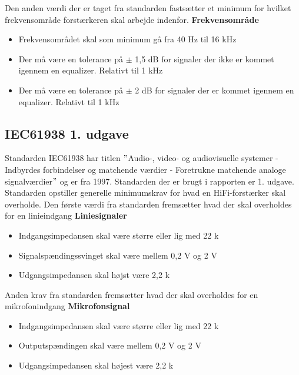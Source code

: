 Den anden værdi der er taget fra standarden fastsætter et minimum for hvilket frekvensområde forstærkeren skal arbejde indenfor.
\newline 
\newline
\textbf{Frekvensområde}
\begin{itemize}
\item Frekvensområdet skal som minimum gå fra 40 Hz til 16 kHz
\item Der må være en tolerance på $\pm$ 1,5 dB for signaler der ikke er kommet igennem en equalizer. Relativt til 1 kHz
\item Der må være en tolerance på $\pm$ 2 dB for signaler der er kommet igennem en equalizer. Relativt til 1 kHz
\end{itemize}


\subsection*{IEC61938 1. udgave}
\label{IEC61938}
Standarden IEC61938 har titlen $"$Audio-, video- og audiovisuelle systemer - Indbyrdes forbindelser og matchende værdier - Foretrukne matchende analoge signalværdier$"$ og er fra 1997. Standarden der er brugt i rapporten er 1. udgave. Standarden opstiller generelle minimumskrav for hvad en HiFi-forstærker skal overholde. \cite{IEC61938}%
\newline
\newline
Den første værdi fra standarden fremsætter hvad der skal overholdes for en linieindgang
\newline
\newline
\textbf{Liniesignaler}
\begin{itemize}
\item Indgangsimpedansen skal være større eller lig med 22 k\ohm
\item Signalspændingssvinget skal være mellem 0,2 V og 2 V
\item Udgangsimpedansen skal højst være 2,2 k\ohm
\end{itemize}
Anden krav fra standarden fremsætter hvad der skal overholdes for en mikrofonindgang
\newline 
\newline
\textbf{Mikrofonsignal}
\begin{itemize}
\item Indgangsimpedansen skal være større eller lig med 22 k\ohm
\item Outputspændingen skal være mellem 0,2 V og 2 V
\item Udgangsimpedansen skal højest være 2,2 k\ohm
\end{itemize}

